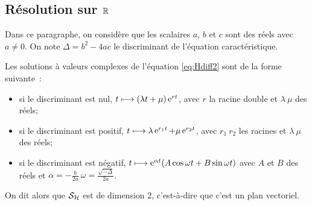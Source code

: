 \subsection{Résolution sur \(\mathbb{R}\)}
\label{subsec:resR}
Dans ce paragraphe, on considère que les scalaires \(a\), \(b\) et \(c\) sont des réels avec \(a \neq 0\). On note \(\Delta=b^2-4ac\) le discriminant de l'équation caractéristique.
\begin{theo}
  \label{theo:6} 
  Les solutions à valeurs complexes de l'équation \eqref{eq:Hdiff2} sont de la forme suivante~:
  \begin{itemize}
  \item si le discriminant est nul, \(t \longmapsto (\lambda t + \mu)\operatorname{e}^{rt}\), avec \(r\) la racine double et \(\lambda \ \mu\) des réels;
  \item si le discriminant est positif, \(t \longmapsto \lambda \operatorname{e}^{r_1 t} + \mu \operatorname{e}^{r_2 t}\), avec \(r_1 \ r_2\) les racines et \(\lambda \ \mu\) des réels;
  \item si le discriminant est négatif, \(t \longmapsto \operatorname{e}^{\alpha t} (A \cos \omega t + B \sin \omega t)\) avec \(A\) et \(B\) des réels et \(\alpha=-\frac{b}{2a} \ \omega = \frac{\sqrt{-\Delta}}{2a}\).
  \end{itemize}
  On dit alors que \(\mathcal{S}_{\mathcal{H}}\) est de dimension 2, c'est-à-dire que c'est un plan vectoriel.
\end{theo}
